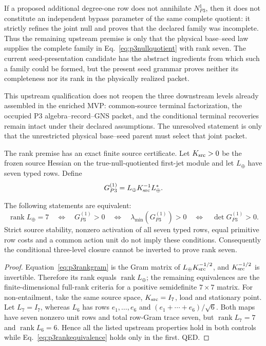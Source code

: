 If a proposed additional degree-one row does not annihilate $N_{P3}^{1}$,
then it does not constitute an independent bypass parameter of the same
complete quotient: it strictly refines the joint null and proves that the
declared family was incomplete.  Thus the remaining upstream premise is only
that the physical base--seed law supplies the complete family in
Eq.~\eqref{eq:p3nullquotient} with rank seven.  The current seed-presentation
candidate has the abstract ingredients from which such a family could be
formed, but the present seed grammar proves neither its completeness nor its
rank in the physically realized packet.

This upstream qualification does not reopen the three downstream levels
already assembled in the enriched MVP: common-source terminal factorization,
the occupied P3 algebra--record--GNS packet, and the conditional terminal
recoveries remain intact under their declared assumptions.  The unresolved
statement is only that the unrestricted physical base--seed parent must select
that joint packet.

The rank premise has an exact finite source certificate.  Let
$K_{\rm src}>0$ be the frozen source Hessian on the true-null-quotiented
first-jet module and let $L_\oplus$ have seven typed rows.  Define
\begin{equation}
G_{P3}^{(1)}=L_\oplus K_{\rm src}^{-1}L_\oplus^*.
\label{eq:p3rankgram}
\end{equation}

\begin{proposition}
\label{prop:p3rankcertificate}
The following statements are equivalent:
\begin{equation}
\operatorname{rank}L_\oplus=7
\quad\Longleftrightarrow\quad
G_{P3}^{(1)}>0
\quad\Longleftrightarrow\quad
\lambda_{\min}(G_{P3}^{(1)})>0
\quad\Longleftrightarrow\quad
\det G_{P3}^{(1)}>0.
\label{eq:p3rankequivalence}
\end{equation}
Strict source stability, nonzero activation of all seven typed rows, equal
primitive row costs and a common action unit do not imply these conditions.
Consequently the conditional three-level closure cannot be inverted to prove
rank seven.
\end{proposition}

\begin{proof}
Equation~\eqref{eq:p3rankgram} is the Gram matrix of
$L_\oplus K_{\rm src}^{-1/2}$, and $K_{\rm src}^{-1/2}$ is invertible.
Therefore its rank equals $\operatorname{rank}L_\oplus$; the remaining
equivalences are the finite-dimensional full-rank criteria for a positive
semidefinite $7\times7$ matrix.  For non-entailment, take the same source
space, $K_{\rm src}=I_7$, load and stationary point.  Let $L_7=I_7$, whereas
$L_6$ has rows $e_1,\ldots,e_6$ and
$(e_1+\cdots+e_6)/\sqrt6$.  Both maps have seven nonzero unit rows and total
row-Gram trace seven, but $\operatorname{rank}L_7=7$ and
$\operatorname{rank}L_6=6$.  Hence all the listed upstream properties hold
in both controls while Eq.~\eqref{eq:p3rankequivalence} holds only in the
first.  QED.
\end{proof}

